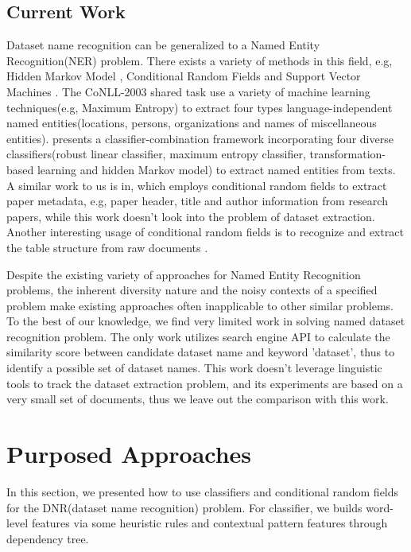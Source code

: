 \documentclass[10pt]{article}
\begin{document}
\subsection{Current Work}
Dataset name recognition can be generalized to a Named Entity Recognition(NER) problem. There exists a variety of methods \cite{eddy1996hidden,lafferty2001conditional, tjong2003introduction, cortes1995support, florian2003named, peng2006information, pinto2003table} in this field, e.g, Hidden Markov Model \cite{eddy1996hidden}, Conditional Random Fields \cite{lafferty2001conditional} and Support Vector Machines \cite{cortes1995support}. The CoNLL-2003 shared task \cite{tjong2003introduction} use a variety of machine learning techniques(e.g, Maximum Entropy) to extract four types language-independent named entities(locations, persons, organizations and names of miscellaneous entities). \cite{florian2003named} presents a classifier-combination framework incorporating four diverse classifiers(robust linear classifier, maximum entropy classifier, transformation-based learning and hidden Markov model) to extract named entities from texts. A similar work to us is in\cite{peng2006information}, which employs conditional random fields to extract paper metadata, e.g, paper header, title and author information from research papers, while this work doesn't look into the problem of dataset extraction. Another interesting usage of conditional random fields is to recognize and extract the table structure from raw documents \cite{pinto2003table}.  

Despite the existing variety of approaches for Named Entity Recognition problems, the inherent diversity nature and the noisy contexts of a specified problem make existing approaches often inapplicable to other similar problems. To the best of our knowledge, we find very limited work in solving named dataset recognition problem. The only work \cite{singhaldata} utilizes search engine API to calculate the similarity score between candidate dataset name and keyword 'dataset', thus to identify a possible set of dataset names. This work doesn't leverage linguistic tools to track the dataset extraction problem, and its experiments are based on a very small set of documents, thus we leave out the comparison with this work. 

\section{Purposed Approaches} 
In this section, we presented how to use classifiers and conditional random fields for the DNR(dataset name recognition) problem. For classifier, we builds word-level features via some heuristic rules and contextual pattern features through dependency tree. 
\end{document}
